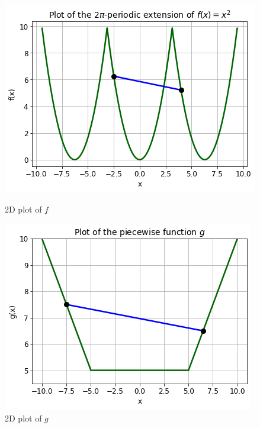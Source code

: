 \begin{figure}[h]
  \hspace{-1.1cm} %
  \centering
  \begin{minipage}[b]{0.37\textwidth}
    \includegraphics[width=\textwidth]{Pictures/Periodic_function_NC.png}
    \caption{2D plot of $f$}\label{fig:periodic_f}
  \end{minipage}
  \hspace{0.3cm} 
  \begin{minipage}[b]{0.37\textwidth}
    \includegraphics[width=\textwidth]{Pictures/piecewise_function_C.png}
    \caption{2D plot of $g$}\label{fig:piecewise_g}
  \end{minipage}
\end{figure}\\
